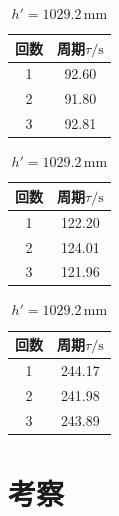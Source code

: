 \documentclass{jarticle}
\begin{document}
\begin{table}[h]
  \centering
  \begin{minipage}{0.3\textwidth}
    \caption{$h'=1049.9\,\mathrm{mm}$}
    \begin{tabular}{cc}
        \hline
        回数 & 周期$\tau/\mathrm{s}$ \\
        \hline
        1 & 92.60 \\
        2 & 91.80 \\
        3 & 92.81 \\
        \hline
    \end{tabular}
  \end{minipage}
  \begin{minipage}{0.3\textwidth}
    \caption{$h'=1039.4\,\mathrm{mm}$}
    \begin{tabular}{cc}
        \hline
        回数 & 周期$\tau/\mathrm{s}$ \\
        \hline
        1 & 122.20 \\
        2 & 124.01 \\
        3 & 121.96 \\
        \hline
    \end{tabular}
  \end{minipage}
  \begin{minipage}{0.3\textwidth}
    \caption{$h'=1029.2\,\mathrm{mm}$}
    \begin{tabular}{cc}
        \hline
        回数 & 周期$\tau/\mathrm{s}$ \\
        \hline
        1 & 244.17 \\
        2 & 241.98 \\
        3 & 243.89 \\
        \hline
    \end{tabular}
  \end{minipage}
\end{table}

\section{考察}
\end{document}
